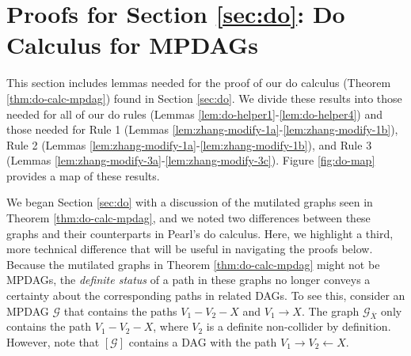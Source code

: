 \documentclass[11pt]{article}
\newcommand{\g}[1][G]{\mathcal{#1}}
\begin{document}
\section{Proofs for Section \ref{sec:do}: Do Calculus for MPDAGs}
\label{app:do}

This section includes lemmas needed for the proof of our do calculus (Theorem \ref{thm:do-calc-mpdag}) found in Section \ref{sec:do}. We divide these results into those needed for all of our do rules (Lemmas \ref{lem:do-helper1}-\ref{lem:do-helper4}) and those needed for Rule 1 (Lemmas \ref{lem:zhang-modify-1a}-\ref{lem:zhang-modify-1b}), Rule 2 (Lemmas \ref{lem:zhang-modify-1a}-\ref{lem:zhang-modify-1b}), and Rule 3 (Lemmas \ref{lem:zhang-modify-3a}-\ref{lem:zhang-modify-3c}). Figure \ref{fig:do-map} provides a map of these results.

We began Section \ref{sec:do} with a discussion of the mutilated graphs seen in Theorem \ref{thm:do-calc-mpdag}, and we noted two differences between these graphs and their counterparts in Pearl's do calculus. Here, we highlight a third, more technical difference that will be useful in navigating the proofs below. Because the mutilated graphs in Theorem \ref{thm:do-calc-mpdag} might not be MPDAGs, the \textit{definite status} of a path in these graphs no longer conveys a certainty about the corresponding paths in related DAGs. To see this, consider an MPDAG $\g$ that contains the paths $V_1 - V_2 - X$ and $V_1 \to X$. The graph $\g_{\overline{X}}$ only contains the path $V_1 - V_2 - X$, where $V_2$ is a definite non-collider by definition. However, note that $[\g]$ contains a DAG with the path $V_1 \to V_2 \gets X$.
\end{document}
